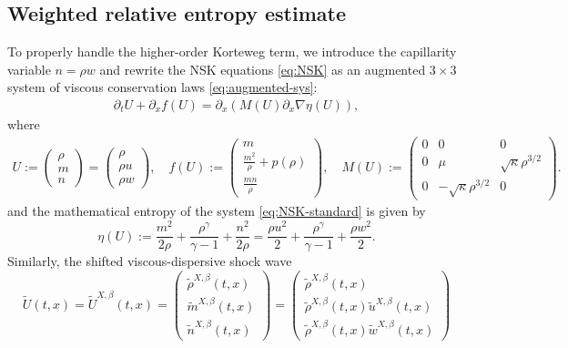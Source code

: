 \documentclass[11pt,reqno]{amsart}
\numberwithin{equation}{section} %
\newcommand{\pa}{\partial}
\begin{document}
\subsection{Weighted relative entropy estimate}
To properly handle the higher-order Korteweg term, we introduce the capillarity variable $n = \rho w$ and rewrite the NSK equations \eqref{eq:NSK} as an augmented $3 \times 3$ system of viscous conservation laws \eqref{eq:augmented-sys}:
\begin{align}\label{eq:NSK-standard}
	\pa_tU + \pa_xf(U) = \pa_x(M(U)\pa_x\nabla\eta(U)),
\end{align}
where
\begin{align*}
    U:=\begin{pmatrix}
	\rho\\m\\n
    \end{pmatrix}=\begin{pmatrix}
    \rho\\\rho u\\ \rho w
    \end{pmatrix},\quad f(U):=\begin{pmatrix}
    m\\ \frac{m^2}{\rho}+p(\rho)\\ \frac{mn}{\rho}
    \end{pmatrix},\quad M(U):=\begin{pmatrix}
    0& 0 & 0 \\ 0 & \mu & \sqrt{\kappa} \rho^{3/2}\\0 & -\sqrt{\kappa} \rho^{3/2} & 0
    \end{pmatrix}.
\end{align*}
and the mathematical entropy of the system \eqref{eq:NSK-standard} is given by
\[\eta(U):=\frac{m^2}{2\rho}+\frac{\rho^\gamma}{\gamma-1}+\frac{n^2}{2\rho}=\frac{\rho u^2}{2}+\frac{\rho^{\gamma}}{\gamma-1}+\frac{\rho w^2}{2}.\]
Similarly, the shifted viscous-dispersive shock wave \[\tilde{U}(t,x)=\tilde{U}^{X,\beta}(t,x)=\begin{pmatrix}
\tilde{\rho}^{X,\beta}(t,x)\\\tilde{m}^{X,\beta}(t,x)\\\tilde{n}^{X,\beta}(t,x)
\end{pmatrix}=\begin{pmatrix}
\tilde{\rho}^{X,\beta}(t,x)\\\tilde{\rho}^{X,\beta}(t,x)\tilde{u}^{X,\beta}(t,x)\\\tilde{\rho}^{X,\beta}(t,x)\tilde{w}^{X,\beta}(t,x)
\end{pmatrix}\]
\end{document}
